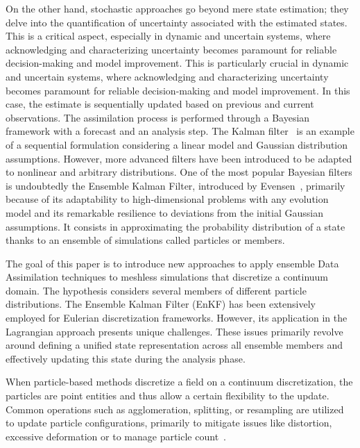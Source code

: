 On the other hand, stochastic approaches go beyond mere state estimation; they delve into the quantification of uncertainty associated with the estimated states. This is a critical aspect, especially in dynamic and uncertain systems, where acknowledging and characterizing uncertainty becomes paramount for reliable decision-making and model improvement. This is particularly crucial in dynamic and uncertain systems, where acknowledging and characterizing uncertainty becomes paramount for reliable decision-making and model improvement. In this case, the estimate is sequentially updated based on previous and current observations. The assimilation process is performed through a Bayesian framework with a forecast and an analysis step. The Kalman filter~\cite{kalman_new_1960} is an example of a sequential formulation considering a linear model and Gaussian distribution assumptions. However, more advanced filters have been introduced to be adapted to nonlinear and arbitrary distributions. One of the most popular Bayesian filters is undoubtedly the Ensemble Kalman Filter, introduced by Evensen~\cite{evensen_sequential_1994}, primarily because of its adaptability to high-dimensional problems with any evolution model and its remarkable resilience to deviations from the initial Gaussian assumptions. It consists in approximating the probability distribution of a state thanks to an ensemble of simulations called particles or members. \newline

The goal of this paper is to introduce new approaches to apply ensemble Data Assimilation techniques to meshless simulations that discretize a continuum domain. The hypothesis considers several members of different particle distributions. The Ensemble Kalman Filter (EnKF) has been extensively employed for Eulerian discretization frameworks. However, its application in the Lagrangian approach presents unique challenges. These issues primarily revolve around defining a unified state representation across all ensemble members and effectively updating this state during the analysis phase.

When particle-based methods discretize a field on a continuum discretization, the particles are point entities and thus allow a certain flexibility to the update. Common operations such as agglomeration, splitting, or resampling are utilized to update particle configurations, primarily to mitigate issues like distortion, excessive deformation or to manage particle count~\cite{yue_continuum_2015,cottet_multi-purpose_1999}.

